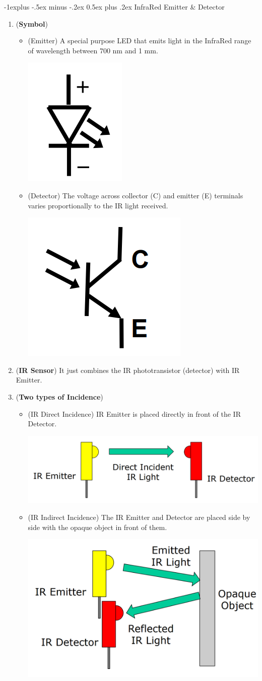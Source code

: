 \documentclass[10pt, landscape]{article}
\makeatletter
\renewcommand{\subsection}{\@startsection{subsection}{2}{0mm}%
                                {-1explus -.5ex minus -.2ex}%
                                {0.5ex plus .2ex}%
                                {\normalfont\normalsize\bfseries}}
\makeatother
\begin{document}
\begin{multicols}{4}
\subsection{InfraRed Emitter \& Detector}
\begin{enumerate}
    \item (\textbf{Symbol})
    \begin{itemize}
        \item (Emitter) A special purpose LED that emits light in the InfraRed range of wavelength between 700 nm and 1 mm. \\
        \centerline{\includegraphics[width=0.1\linewidth]{images/ir-sensor-emitter-symbol.png}}
        \item (Detector) The voltage across collector (C) and emitter (E) terminals varies proportionally to the IR light received. \\
        \centerline{\includegraphics[width=0.1\linewidth]{images/ir-sensor-detector-symbol.png}}
    \end{itemize}
    \item (\textbf{IR Sensor}) It just combines the IR phototransistor (detector) with IR Emitter.
    \item (\textbf{Two types of Incidence})
    \begin{itemize}
        \item (IR Direct Incidence) IR Emitter is placed directly in front of the IR Detector. \\
        \centerline{\includegraphics[width=0.5\linewidth]{images/ir-direct-incidence.png}}
        \item (IR Indirect Incidence) The IR Emitter and Detector are placed side by side with the opaque object in front of them. \\
        \centerline{\includegraphics[width=0.4\linewidth]{images/ir-indirect-incidence.png}}

\end{itemize}
\end{enumerate}
\end{multicols}
\end{document}
